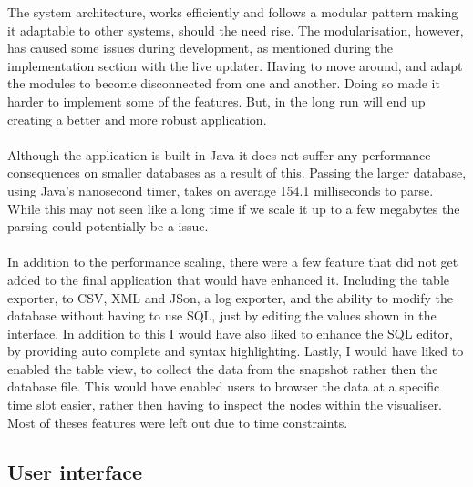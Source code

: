 The system architecture, works efficiently and follows a modular pattern making it adaptable to other systems, should the need rise. The modularisation, however, has caused some issues during development, as mentioned during the implementation section with the live updater. Having to move around, and adapt the modules to become disconnected from one and another. Doing so made it harder to implement some of the features. But, in the long run will end up creating a better and more robust application.
\\\\
Although the application is built in Java it does not suffer any performance consequences on smaller databases as a result of this. Passing the larger database, using Java's nanosecond timer, takes on average  154.1 milliseconds to parse. While this may not seen like a long time if we scale it up to a few megabytes the parsing could potentially be a issue. 
\\\\
In addition to the performance scaling, there were a few feature that did not get added to the final application that would have enhanced it. Including the table exporter, to CSV, XML and JSon, a log exporter, and the ability to modify the database without having to use SQL, just by editing the values shown in the interface. In addition to this I would have also liked to enhance the SQL editor, by providing  auto complete and syntax highlighting. Lastly, I would have liked to enabled the table view, to collect the data from the snapshot rather then the database file. This would have enabled users to browser the data at a specific time slot easier, rather then having to inspect the nodes within the visualiser.  Most of theses features were left out due to time constraints. 

\subsection{User interface}
\label{subsec:user_interface_eval}

